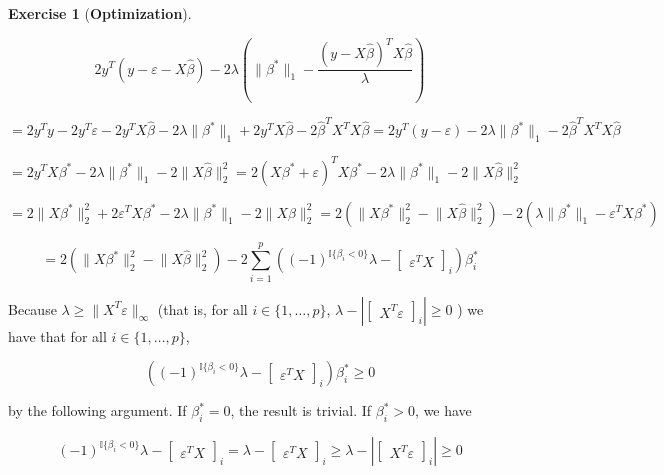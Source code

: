 \documentclass{article}
\theoremstyle{definition}
\newtheorem{exercise}{Exercise}
\theoremstyle{definition}
\theoremstyle{definition}
\theoremstyle{definition}
\renewcommand{\epsilon}{\varepsilon}
\renewcommand{\epsilon}{\varepsilon}
\begin{document}
\begin{exercise}[\textbf{Optimization}]
\begin{enumerate}[(a)]
\begin{enumerate}[(i)]



\[
2y^T (y - \epsilon -X \hat{\beta} ) -  2\lambda \left(\lVert \beta^* \rVert_1 - \frac{(y - X \hat{\beta})^TX \hat{\beta}}{\lambda} \right)  
\]

\[
=2 y^T y - 2y^T \epsilon - 2y^TX \hat{\beta}  -2 \lambda\lVert \beta^* \rVert_1  + 2y^TX \hat{\beta}  -2  \hat{\beta}^T X^T X \hat{\beta} = 2y^T (y -  \epsilon)  -2 \lambda\lVert \beta^* \rVert_1   -  2\hat{\beta}^T X^T X \hat{\beta}
\]

\[
= 2y^T X \beta^* - 2\lambda\lVert \beta^* \rVert_1   -  2\lVert X \hat{\beta} \rVert_2^2  =  2(X \beta^* + \epsilon)^T X \beta^*  - 2 \lambda\lVert \beta^* \rVert_1   - 2\lVert X \hat{\beta} \rVert_2^2
\]

\[
= 2 \lVert X \beta^* \rVert_2^2 + 2\epsilon^T X \beta^* - 2\lambda\lVert \beta^* \rVert_1   - 2 \lVert X \hat{\beta} \rVert_2^2  = 2 \left( \lVert X \beta^* \rVert_2^2  - \lVert X \hat{\beta} \rVert_2^2\right)  - 2 \left( \lambda\lVert \beta^* \rVert_1  -   \epsilon^T X \beta^* \right)
\]

\[
= 2 \left( \lVert X \beta^* \rVert_2^2  - \lVert X \hat{\beta} \rVert_2^2\right)  - 2 \sum_{i=1}^p \left((-1)^{\mathbb{I}{\{\beta_i < 0\}}} \lambda-  \begin{bmatrix} \epsilon^T X \end{bmatrix}_i \right) \beta_i^* 
\]

Because \(\lambda \geq \lVert X^T \epsilon \rVert_\infty\) (that is, for all \(i \in \{1, \ldots, p\}\), \(\lambda -  \left| \begin{bmatrix} X^T \epsilon \end{bmatrix}_i \right| \geq 0 \) ) we have that for all \(i \in \{1, \ldots, p\}\),



\[
 \left((-1)^{\mathbb{I}{\{\beta_i < 0\}}} \lambda-  \begin{bmatrix} \epsilon^T X \end{bmatrix}_i \right) \beta_i^*  \geq 0
 \]
 
 by the following argument. If \(\beta_i^* = 0\), the result is trivial. If \(\beta_i^* > 0\), we have
 
 \[
  (-1)^{\mathbb{I}{\{\beta_i < 0\}}} \lambda-  \begin{bmatrix} \epsilon^T X \end{bmatrix}_i  =   \lambda-  \begin{bmatrix} \epsilon^T X \end{bmatrix}_i  \geq \lambda -  \left| \begin{bmatrix} X^T \epsilon \end{bmatrix}_i \right|  \geq 0
  \]
  

\end{enumerate}
\end{enumerate}
\end{exercise}
\end{document}
